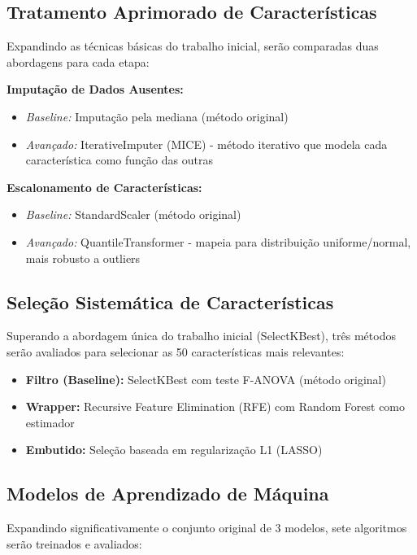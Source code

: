 \documentclass[12pt, a4paper]{article}
\begin{document}
\subsection{Tratamento Aprimorado de Características}
Expandindo as técnicas básicas do trabalho inicial, serão comparadas duas abordagens para cada etapa:

\textbf{Imputação de Dados Ausentes:}
\begin{itemize}
    \item \textit{Baseline:} Imputação pela mediana (método original)
    \item \textit{Avançado:} IterativeImputer (MICE) - método iterativo que modela cada característica como função das outras
\end{itemize}

\textbf{Escalonamento de Características:}
\begin{itemize}
    \item \textit{Baseline:} StandardScaler (método original)
    \item \textit{Avançado:} QuantileTransformer - mapeia para distribuição uniforme/normal, mais robusto a outliers
\end{itemize}

\subsection{Seleção Sistemática de Características}
Superando a abordagem única do trabalho inicial (SelectKBest), três métodos serão avaliados para selecionar as 50 características mais relevantes:

\begin{itemize}
    \item \textbf{Filtro (Baseline):} SelectKBest com teste F-ANOVA (método original)
    \item \textbf{Wrapper:} Recursive Feature Elimination (RFE) com Random Forest como estimador
    \item \textbf{Embutido:} Seleção baseada em regularização L1 (LASSO)
\end{itemize}

\subsection{Modelos de Aprendizado de Máquina}
Expandindo significativamente o conjunto original de 3 modelos, sete algoritmos serão treinados e avaliados:
\end{document}
